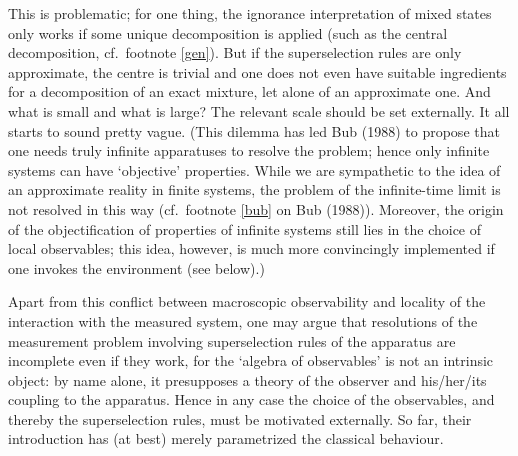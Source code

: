 \documentclass[12pt,titlepage]{article}
\begin{document}
This is problematic; for one thing, the ignorance interpretation of mixed
states only works if
some unique decomposition is applied (such as the central decomposition, cf.\
footnote \ref{gen}).
But if the superselection rules are only approximate, the centre is trivial and
one does not even
have  suitable ingredients for a decomposition of an exact mixture, let alone
of an approximate
one.
 And what is small and what is large? The relevant
scale should be set externally.
It all starts to sound pretty vague. (This dilemma has led Bub (1988)
  to propose that one needs truly infinite apparatuses to resolve the problem;
hence only
infinite systems can have `objective' properties.  While we are sympathetic to
the idea of an
approximate reality in finite systems, the problem of the infinite-time limit
is not resolved in this
way (cf.\  footnote \ref{bub} on  Bub (1988)). Moreover, the origin of the
objectification of
properties of infinite systems still lies in the choice of local observables;
this idea, however, is
much more convincingly implemented if one invokes the environment (see below).)



Apart from this conflict between macroscopic observability and locality of the
interaction with the
measured system, one may argue that resolutions of the measurement problem
involving superselection
rules of the apparatus are incomplete even if they work, for the `algebra of
observables' is not an
intrinsic object: by name alone, it presupposes a theory of the observer and
his/her/its coupling to
the apparatus. Hence in any case the choice of the observables, and thereby the
superselection rules,
must be motivated externally. So far, their introduction has (at best) merely
parametrized the
classical behaviour.
\end{document}
